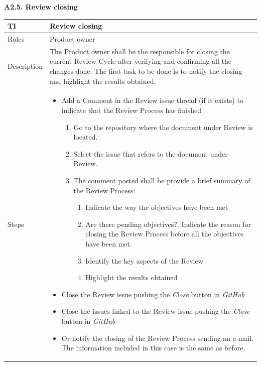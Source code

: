 \documentclass{template/openetcs_article}
\begin{document}
\textbf{A2.5. Review closing}

\begin{flushleft}
\tablefirsthead{}
\tablehead{}
\tabletail{}
\tablelasttail{}
\begin{supertabular}{|m{2cm}|m{13cm}|}
\hline
{}
TI & 
Review closing
\\\hline
Roles &
Product owner
\\\hline
Description &
The Product owner shall be the responsible for closing the current Review Cycle after verifying and confirming all the changes done. The first task to be done is to notify the closing and highlight the results obtained.
\\\hline
Steps &
\begin{itemize}
\item Add a Comment in the Review issue thread (if it exists) to indicate that the Review Process has finished
\begin{enumerate}
\item Go to the repository where the document under Review is located.
\item Select the issue that refers to the document under Review.
\item The comment posted shall be provide a brief summary of the Review Process:
\begin{enumerate}
\item Indicate the way the objectives have been met 
\item Are there pending objectives?. Indicate the reason for closing the Review Process before all the objectives have been met.
\item Identify the key aspects of the Review
\item Highlight the results obtained
\end{enumerate}
\end{enumerate}
\item Close the Review issue pushing the {\it Close} button in {\it GitHub}
\item Close the issues linked to the Review issue pushing the {\it Close} button in {\it GitHub}
\item Or notify the closing of the Review Process sending an e-mail. The information included in this case is the same as before.
\end{itemize}
\\\hline
\end{supertabular}
\end{flushleft}
\end{document}
